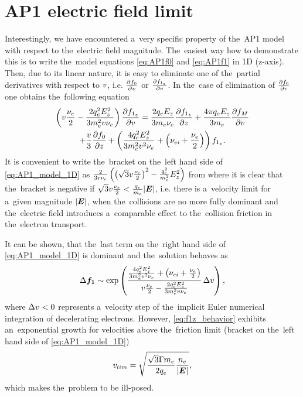 \section{AP1 electric field limit}
\label{app:AP1limit}

Interestingly, we have encountered a~very specific property of the~AP1 model
with respect to the~electric field magnitude. The~easiest way how to 
demonstrate this is to write the~model equations \eqref{eq:AP1f0} and 
\eqref{eq:AP1f1} in 1D (z-axis). Then, due to its linear nature, it is easy 
to eliminate one of the~partial derivatives with respect to $v$, i.e. 
$\frac{\partial{f_0}}{\partial{v}}$ or $\frac{\partial{f_{1_z}}}{\partial{v}}$. 
In the~case of elimination of $\frac{\partial{f_0}}{\partial{v}}$ 
one obtains the~following equation
\begin{multline}
  \left(v\frac{\nu_{e}}{2} - \frac{2q_e^2E_z^2}{3m_e^2v\nu_{e}}\right) 
  \frac{\partial{f_{1_z}}}{\partial{v}} 
  =
  \frac{2q_eE_z}{3m_e\nu_{e}}\frac{\partial{f_{1_z}}}{\partial{z}}  
  + \frac{4\pi q_eE_z}{3m_e}\frac{\partial{f_M}}{\partial{v}} \\
  + \frac{v}{3}\frac{\partial{f_0}}{\partial{z}} 
  + \left(\frac{4q_e^2E_z^2}{3m_e^2v^2\nu_{e}}
  + \left(\nu_{ei} + \frac{\nu_{e}}{2}\right) \right)f_{1_z} .
  \label{eq:AP1_model_1D}
\end{multline}
It is convenient to write the~bracket on the~left hand side of 
\eqref{eq:AP1_model_1D} as
$\frac{2}{3v\nu_{e}} 
\left(\left(\sqrt{3}v\frac{\nu_{e}}{2}\right)^2 
- \frac{q_e^2}{m_e^2}E_z^2\right)$
from where it is clear that the~bracket is negative if 
$\sqrt{3}v\frac{\nu_{e}}{2} < \frac{q_e}{m_e}|\boldsymbol{E}|$, 
i.e. there is a~velocity limit for a~given magnitude $|\boldsymbol{E}|$, 
when the~collisions are no more fully dominant and the~electric field 
introduces a~comparable effect to the~collision friction in 
the~electron transport.

It can be shown, that the~last term on the~right hand side of 
\eqref{eq:AP1_model_1D} is dominant and the~solution behaves as 
\begin{equation}
  \Delta \boldsymbol{f_1} \sim \exp\left(\frac{\frac{4q_e^2E_z^2}{3m_e^2v^2\nu_{e}}
  + \left(\nu_{ei} + \frac{\nu_{e}}{2}\right)}
  {v\frac{\nu_{e}}{2} - \frac{2q_e^2E_z^2}{3m_e^2v\nu_{e}}}\, 
  \Delta v\right) ,
  \label{eq:f1z_behavior}
\end{equation}
where $\Delta v < 0$ represents a~velocity step of the~implicit Euler
numerical integration of decelerating electrons.
However, \eqref{eq:f1z_behavior} exhibits an~exponential growth 
for velocities above the~friction limit (bracket on the~left hand side of 
\eqref{eq:AP1_model_1D})
\begin{equation}
  v_{lim}  = \sqrt{\frac{\sqrt{3}\Gamma m_e}{2q_e}\frac{n_e}{|\boldsymbol{E}|}} ,
  \label{eq:v_limit}
\end{equation}
which makes the~problem to be ill-posed.

